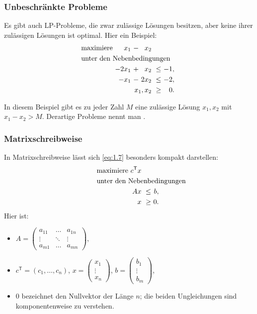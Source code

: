 \documentclass[smaller]{beamer}
\newcommand{\T}{\mathsf{T}}
\begin{document}
\begin{frame}
 \frametitle{Unbeschr\"ankte Probleme}
 Es gibt auch LP-Probleme, die zwar zulässige Lösungen besitzen, aber keine ihrer zulässigen Lösungen ist optimal. Hier ein Beispiel:
\begin{align*}
\begin{alignedat}{4}
& \text{maximiere } & x_1 &\ - &\ x_2 & & \\
& \rlap{unter den Nebenbedingungen} & & & & & \\
&& -2x_1 &\ + &\  x_2 &\ \leq &\ -1,\ \\
&&  -x_1 &\ - &\ 2x_2 &\ \leq &\ -2,\ \\
&& & & \llap{$x_1, x_2$} &\ \geq &\ 0.\ 
\end{alignedat}
\end{align*}

In diesem Beispiel gibt es zu jeder Zahl $M$ eine zulässige Lösung $x_1,x_2$ mit $x_1-x_2 > M$. Derartige Probleme nennt man .
\end{frame}

\begin{frame}
 \frametitle{Matrixschreibweise}
 In Matrixschreibweise lässt sich \eqref{eq:1.7} besonders kompakt darstellen:
\begin{align}
\begin{alignedat}{3}
\label{eq:1:7'}
& \text{maximiere } & c^\T x & & \\
& \rlap{unter den Nebenbedingungen} & & & \\
&& Ax &\ \leq &\ b,\ \\
&&  x &\ \geq &\ 0.\
\end{alignedat}
\end{align}
 Hier ist:
 \begin{itemize}
  \item $A = \begin{pmatrix} a_{11} & \ldots & a_{1n} \\ \vdots & \ddots & \vdots \\ a_{m1} & \ldots & a_{mn} \end{pmatrix}$,
  \item $c^\T = (c_1, \ldots, c_n)$, $x= \begin{pmatrix} x_1 \\ \vdots \\ x_n \end{pmatrix}$, $b = \begin{pmatrix} b_1 \\ \vdots \\ b_m \end{pmatrix}$,
  \item $0$ bezeichnet den Nullvektor der Länge $n$; die beiden Ungleichungen sind komponentenweise zu verstehen.
 \end{itemize}
\end{frame}
\end{document}
